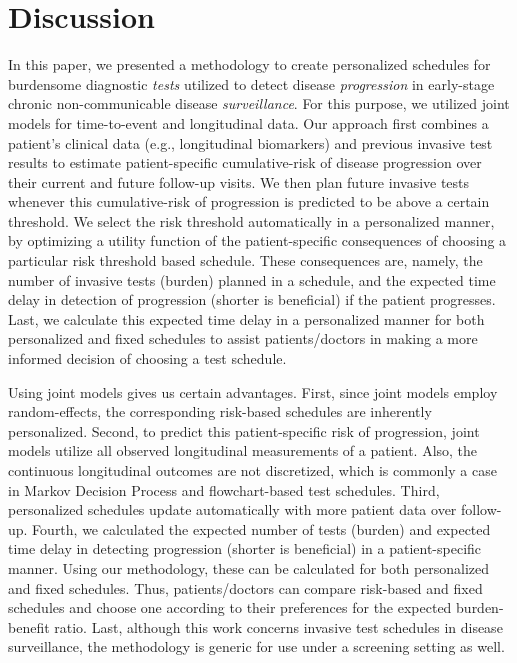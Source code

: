 \section{Discussion}
\label{sec:discussion}
In this paper, we presented a methodology to create personalized schedules for burdensome diagnostic \textit{tests} utilized to detect disease \textit{progression} in early-stage chronic non-communicable disease \textit{surveillance}. For this purpose, we utilized joint models for time-to-event and longitudinal data. Our approach first combines a patient's clinical data (e.g., longitudinal biomarkers) and previous invasive test results to estimate patient-specific cumulative-risk of disease progression over their current and future follow-up visits. We then plan future invasive tests whenever this cumulative-risk of progression is predicted to be above a certain threshold. We select the risk threshold automatically in a personalized manner, by optimizing a utility function of the patient-specific consequences of choosing a particular risk threshold based schedule. These consequences are, namely, the number of invasive tests (burden) planned in a schedule, and the expected time delay in detection of progression (shorter is beneficial) if the patient progresses. Last, we calculate this expected time delay in a personalized manner for both personalized and fixed schedules to assist patients/doctors in making a more informed decision of choosing a test schedule.

Using joint models gives us certain advantages. First, since joint models employ random-effects, the corresponding risk-based schedules are inherently personalized. Second, to predict this patient-specific risk of progression, joint models utilize all observed longitudinal measurements of a patient. Also, the continuous longitudinal outcomes are not discretized, which is commonly a case in Markov Decision Process and flowchart-based test schedules. Third, personalized schedules update automatically with more patient data over follow-up. Fourth, we calculated the expected number of tests (burden) and expected time delay in detecting progression (shorter is beneficial) in a patient-specific manner. Using our methodology, these can be calculated for both personalized and fixed schedules. Thus, patients/doctors can compare risk-based and fixed schedules and choose one according to their preferences for the expected burden-benefit ratio. Last, although this work concerns invasive test schedules in disease surveillance, the methodology is generic for use under a screening setting as well.

